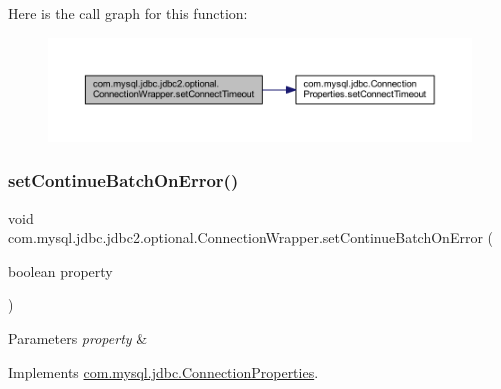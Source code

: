 Here is the call graph for this function\+:
\nopagebreak
\begin{figure}[H]
\begin{center}
\leavevmode
\includegraphics[width=350pt]{classcom_1_1mysql_1_1jdbc_1_1jdbc2_1_1optional_1_1_connection_wrapper_aba78fb901b9a9d79b7432393b49febf0_cgraph}
\end{center}
\end{figure}
\mbox{\label{classcom_1_1mysql_1_1jdbc_1_1jdbc2_1_1optional_1_1_connection_wrapper_a0d0494da50a007f3aea31ada724385d9}} 
\subsubsection{\texorpdfstring{set\+Continue\+Batch\+On\+Error()}{setContinueBatchOnError()}}
{\footnotesize\ttfamily void com.\+mysql.\+jdbc.\+jdbc2.\+optional.\+Connection\+Wrapper.\+set\+Continue\+Batch\+On\+Error (\begin{DoxyParamCaption}\item[{boolean}]{property }\end{DoxyParamCaption})}


\begin{DoxyParams}{Parameters}
{\em property} & \\
\hline
\end{DoxyParams}


Implements \mbox{\hyperlink{interfacecom_1_1mysql_1_1jdbc_1_1_connection_properties_a5f3f94fedf8c3162e2b825279a9d01ed}{com.\+mysql.\+jdbc.\+Connection\+Properties}}.

